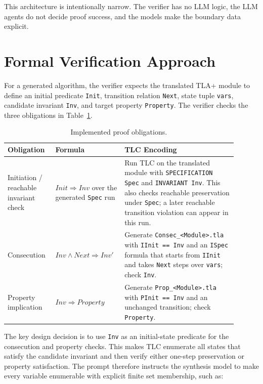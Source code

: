 \documentclass[11pt]{article}
\begin{document}
This architecture is intentionally narrow. The verifier has no LLM logic, the
LLM agents do not decide proof success, and the models make the boundary data
explicit.

\section{Formal Verification Approach}

For a generated algorithm, the verifier expects the translated TLA+ module to
define an initial predicate \texttt{Init}, transition relation \texttt{Next},
state tuple \texttt{vars}, candidate invariant \texttt{Inv}, and target
property \texttt{Property}. The verifier checks the three obligations in
Table~\ref{tab:obligations}.

\begin{table}[h]
\centering
\begin{tabular}{p{0.19\linewidth}p{0.25\linewidth}p{0.46\linewidth}}
\toprule
Obligation & Formula & TLC Encoding \\
\midrule
Initiation / reachable invariant check & $Init \Rightarrow Inv$ over the
generated \texttt{Spec} run &
Run TLC on the translated module with \texttt{SPECIFICATION Spec} and
\texttt{INVARIANT Inv}. This also checks reachable preservation under
\texttt{Spec}; a later reachable transition violation can appear in this run. \\
Consecution & $Inv \land Next \Rightarrow Inv'$ &
Generate \texttt{Consec\_<Module>.tla} with \texttt{IInit == Inv} and
an \texttt{ISpec} formula that starts from \texttt{IInit} and takes
\texttt{Next} steps over \texttt{vars}; check \texttt{Inv}. \\
Property implication & $Inv \Rightarrow Property$ &
Generate \texttt{Prop\_<Module>.tla} with \texttt{PInit == Inv} and an
unchanged transition; check \texttt{Property}. \\
\bottomrule
\end{tabular}
\caption{Implemented proof obligations.}
\label{tab:obligations}
\end{table}

The key design decision is to use \texttt{Inv} as an initial-state predicate
for the consecution and property checks. This makes TLC enumerate all states
that satisfy the candidate invariant and then verify either one-step
preservation or property satisfaction. The prompt therefore instructs the
synthesis model to make every variable enumerable with explicit finite set
membership, such as:
\end{document}
